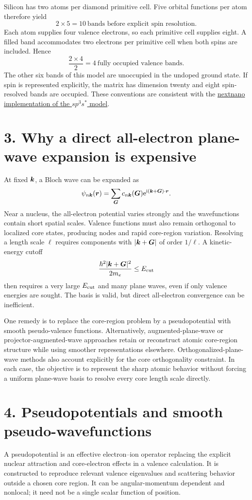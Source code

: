 Silicon has two atoms per diamond primitive cell. Five orbital functions per atom therefore yield
\[
\boxed{2\times5=10\ \text{bands before explicit spin resolution}}.
\]
Each atom supplies four valence electrons, so each primitive cell supplies eight. A filled band accommodates two electrons per primitive cell when both spins are included. Hence
\[
\boxed{\frac{2\times4}{2}=4\ \text{fully occupied valence bands}}.
\]
The other six bands of this model are unoccupied in the undoped ground state. If spin is represented explicitly, the matrix has dimension twenty and eight spin-resolved bands are occupied. These conventions are consistent with the
\href{https://www.nextnano.com/docu/nextnano3/tutorials/1D_TightBinding_bulk.html}{nextnano implementation of the $sp^3s^*$ model}.

\section*{3. Why a direct all-electron plane-wave expansion is expensive}
At fixed $\boldsymbol{k}$, a Bloch wave can be expanded as
\[
\psi_{n\boldsymbol{k}}(\boldsymbol{r})=\sum_{\boldsymbol{G}}c_{n\boldsymbol{k}}(\boldsymbol{G})
\mathrm{e}^{\mathrm{i}(\boldsymbol{k}+\boldsymbol{G})\cdot\boldsymbol{r}}.
\]
Near a nucleus, the all-electron potential varies strongly and the wavefunctions contain short spatial scales. Valence functions must also remain orthogonal to localized core states, producing nodes and rapid core-region variation. Resolving a length scale $\ell$ requires components with $|\boldsymbol{k}+\boldsymbol{G}|$ of order $1/\ell$. A kinetic-energy cutoff
\[
\frac{\hbar^2|\boldsymbol{k}+\boldsymbol{G}|^2}{2m_e}\le E_{\rm cut}
\]
then requires a very large $E_{\rm cut}$ and many plane waves, even if only valence energies are sought. The basis is valid, but direct all-electron convergence can be inefficient.

One remedy is to replace the core-region problem by a pseudopotential with smooth pseudo-valence functions. Alternatively, augmented-plane-wave or projector-augmented-wave approaches retain or reconstruct atomic core-region structure while using smoother representations elsewhere. Orthogonalized-plane-wave methods also account explicitly for the core orthogonality constraint. In each case, the objective is to represent the sharp atomic behavior without forcing a uniform plane-wave basis to resolve every core length scale directly.

\section*{4. Pseudopotentials and smooth pseudo-wavefunctions}
A pseudopotential is an effective electron--ion operator replacing the explicit nuclear attraction and core-electron effects in a valence calculation. It is constructed to reproduce relevant valence eigenvalues and scattering behavior outside a chosen core region. It can be angular-momentum dependent and nonlocal; it need not be a single scalar function of position.

